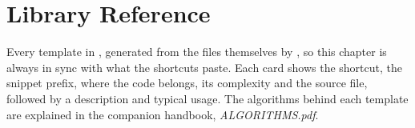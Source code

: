 \documentclass[11pt, openany]{book}
\begin{document}
\frontmatter

\tableofcontents
\mainmatter







\chapter{Library Reference}\label{ch:reference}
Every template in , generated from the files themselves by , so this
chapter is always in sync with what the shortcuts paste. Each card shows the shortcut, the snippet prefix, where
the code belongs, its complexity and the source file, followed by a description and typical usage.
The algorithms behind each template are explained in the companion handbook, \emph{ALGORITHMS.pdf}.

\end{document}
